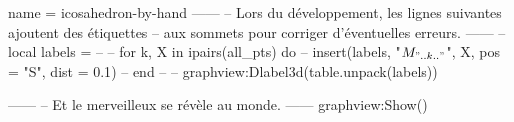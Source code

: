 \documentclass[border = 3pt]{standalone}
\begin{document}
\begin{luadraw}{name = icosahedron-by-hand}
------
-- Lors du développement, les lignes suivantes ajoutent des étiquettes
-- aux sommets pour corriger d'éventuelles erreurs.
------
-- local labels = {}
--
-- for k, X in ipairs(all_pts) do
--   insert(labels, {"$M_{".. k .."}$", X, {pos = "S", dist = 0.1}})
-- end
--
-- graphview:Dlabel3d(table.unpack(labels))

------
-- Et le merveilleux se révèle au monde.
------
graphview:Show()
\end{luadraw}
\end{document}
